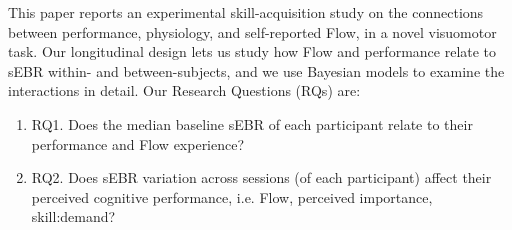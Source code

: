 \documentclass[10pt,letterpaper,floatsintext]{article}
\begin{document}
This paper reports an experimental skill-acquisition study on the connections between performance, physiology, and self-reported Flow, in a novel visuomotor task. Our longitudinal design lets us study how Flow and performance relate to sEBR within- and between-subjects, and we use Bayesian models to examine the interactions in detail. Our Research Questions (RQs) are:


%
%
%
%

\begin{enumerate}
	\item RQ1. Does the median baseline sEBR of each participant relate to their performance and Flow experience?

	\item RQ2. Does sEBR variation across sessions (of each participant) affect their perceived cognitive performance, i.e. Flow, perceived importance, skill:demand?

\end{enumerate}
\end{document}
